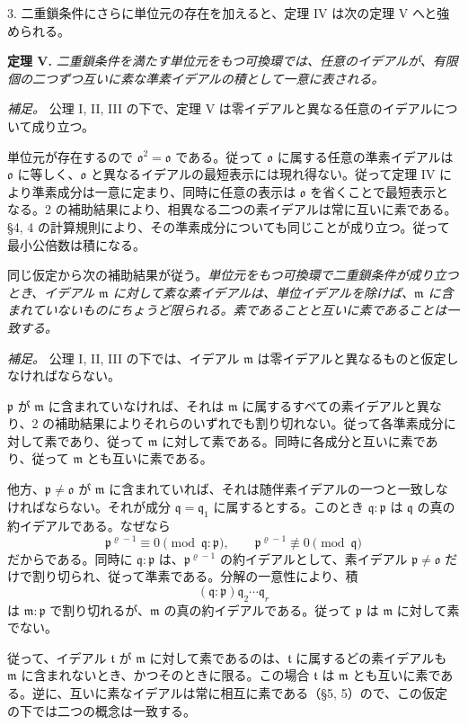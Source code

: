 \documentclass[11pt]{article}
\providecommand{\mm}{\mathfrak{m}}
\providecommand{\mo}{\mathfrak{o}}
\providecommand{\mpideal}{\mathfrak{p}}
\providecommand{\mq}{\mathfrak{q}}
\providecommand{\mt}{\mathfrak{t}}
\begin{document}
3. 二重鎖条件にさらに単位元の存在を加えると、定理 IV は次の定理 V へと強められる。

\textbf{定理 V.} \emph{二重鎖条件を満たす単位元をもつ可換環では、任意のイデアルが、有限個の二つずつ互いに素な準素イデアルの積として一意に表される。}

\emph{補足。} 公理 I, II, III の下で、定理 V は零イデアルと異なる任意のイデアルについて成り立つ。

単位元が存在するので $\mo^2=\mo$ である。従って $\mo$ に属する任意の準素イデアルは $\mo$ に等しく、$\mo$ と異なるイデアルの最短表示には現れ得ない。従って定理 IV により準素成分は一意に定まり、同時に任意の表示は $\mo$ を省くことで最短表示となる。2 の補助結果により、相異なる二つの素イデアルは常に互いに素である。§4, 4 の計算規則により、その準素成分についても同じことが成り立つ。従って最小公倍数は積になる。

同じ仮定から次の補助結果が従う。\emph{単位元をもつ可換環で二重鎖条件が成り立つとき、イデアル $\mm$ に対して素な素イデアルは、単位イデアルを除けば、$\mm$ に含まれていないものにちょうど限られる。素であることと互いに素であることは一致する。}

\emph{補足。} 公理 I, II, III の下では、イデアル $\mm$ は零イデアルと異なるものと仮定しなければならない。

$\mpideal$ が $\mm$ に含まれていなければ、それは $\mm$ に属するすべての素イデアルと異なり、2 の補助結果によりそれらのいずれでも割り切れない。従って各準素成分に対して素であり、従って $\mm$ に対して素である。同時に各成分と互いに素であり、従って $\mm$ とも互いに素である。

他方、$\mpideal\ne\mo$ が $\mm$ に含まれていれば、それは随伴素イデアルの一つと一致しなければならない。それが成分 $\mq=\mq_1$ に属するとする。このとき $\mq:\mpideal$ は $\mq$ の真の約イデアルである。なぜなら
\[
        \mpideal^{\varrho-1}\equiv0\pmod{\mq:\mpideal},\qquad
        \mpideal^{\varrho-1}\not\equiv0\pmod{\mq}
\]
だからである。同時に $\mq:\mpideal$ は、$\mpideal^{\varrho-1}$ の約イデアルとして、素イデアル $\mpideal\ne\mo$ だけで割り切られ、従って準素である。分解の一意性により、積
\[
        (\mq:\mpideal)\mq_2\cdots\mq_r
\]
は $\mm:\mpideal$ で割り切れるが、$\mm$ の真の約イデアルである。従って $\mpideal$ は $\mm$ に対して素でない。

従って、イデアル $\mt$ が $\mm$ に対して素であるのは、$\mt$ に属するどの素イデアルも $\mm$ に含まれないとき、かつそのときに限る。この場合 $\mt$ は $\mm$ とも互いに素である。逆に、互いに素なイデアルは常に相互に素である（§5, 5）ので、この仮定の下では二つの概念は一致する。
\end{document}
